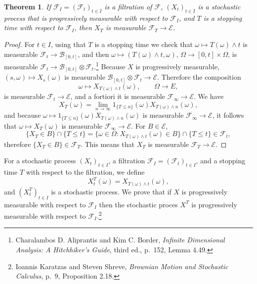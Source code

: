 \documentclass{article}
\theoremstyle{plain}
\newtheorem{theorem}{Theorem}
\theoremstyle{definition}
\begin{document}
\begin{theorem}
If $\mathscr{F}_I  =(\mathscr{F}_t)_{t \in I}$ is a filtration of $\mathscr{F}$,
$(X_t)_{t \in I}$ is a stochastic process that is progressively measurable with respect to $\mathscr{F}_I$,
and $T$ is a stopping time with respect to $\mathscr{F}_I$, then $X_T$ is measurable $\mathscr{F}_T \to \mathscr{E}$.
\label{XT}
\end{theorem}
\begin{proof}
For $t \in I$, using that $T$ is a stopping time we check that $\omega \mapsto T(\omega) \wedge t$ is measurable $\mathscr{F}_t
\to \mathscr{B}_{[0,t]}$, and then $\omega \mapsto (T(\omega) \wedge t,\omega)$,
$\Omega \to [0,t] \times \Omega$,
 is measurable $\mathscr{F}_t \to \mathscr{B}_{[0,t]} \otimes \mathscr{F}_t$.\footnote{Charalambos D. Aliprantis and Kim C. Border, {\em Infinite Dimensional Analysis:
A Hitchhiker's Guide}, third ed., p.~152, Lemma 4.49.}
Because $X$ is progressively
 measurable, $(s,\omega) \mapsto X_s(\omega)$ is measurable
 $\mathscr{B}_{[0,t]} \otimes \mathscr{F}_t \to \mathscr{E}$. Therefore the composition
 \[
 \omega \mapsto X_{T(\omega) \wedge t}(\omega), \qquad \Omega \to E,
 \]
 is measurable $\mathscr{F}_t \to \mathscr{E}$, and a fortiori it is measurable
 $\mathscr{F}_\infty \to \mathscr{E}$.
 We have
 \[
 X_T(\omega) = \lim_{n \to \infty} 1_{\{T \leq n\}}(\omega) X_{T(\omega) \wedge n}(\omega),
 \]
 and because 
 $\omega \mapsto 1_{\{T \leq n\}}(\omega) X_{T(\omega) \wedge n}(\omega)$ is measurable
 $\mathscr{F}_\infty \to \mathscr{E}$, 
 it follows that $\omega \mapsto  X_T(\omega)$  is measurable $\mathscr{F}_\infty \to \mathscr{E}$.
 For $B \in \mathscr{E}$,
 \[
\{X_T \in B\} \cap \{T \leq t\} = \{\omega \in \Omega: X_{T(\omega) \wedge t}(\omega) \in B\} \cap \{T \leq t\} \in \mathscr{F}_t,
 \]
therefore $\{X_T \in B\} \in \mathscr{F}_T$. This means that
$X_T$ is measurable $\mathscr{F}_T \to \mathscr{E}$.
\end{proof}


For a stochastic process $(X_t)_{t \in I}$, a filtration $\mathscr{F}_I =(\mathscr{F}_t)_{t \in I}$, and a stopping time
$T$ with respect to the filtration, we define 
\[
X^T_t(\omega) = X_{T(\omega) \wedge t}(\omega),
\]
and $(X^T_t)_{t \in I}$ is a stochastic process.
We prove that if $X$ is progressively measurable with respect to  $\mathscr{F}_I$ then
the stochastic proces $X^T$ is progressively measurable with respect to $\mathscr{F}_I$.\footnote{Ioannis Karatzas and Steven Shreve,
{\em Brownian Motion and Stochastic Calculus}, 
p.~9, Proposition 2.18.}
\end{document}

